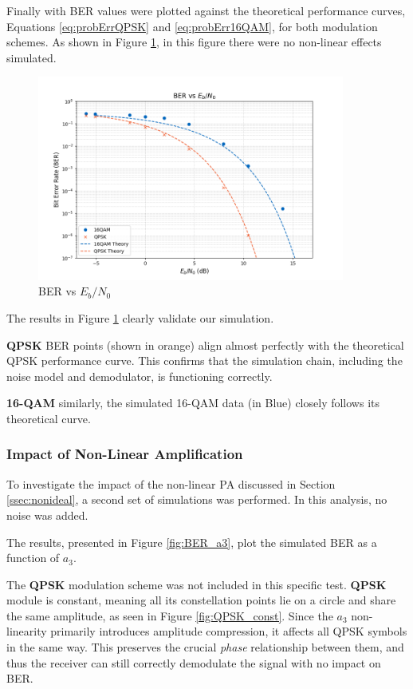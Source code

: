 Finally with BER values were plotted against the theoretical performance curves, Equations \ref{eq:probErrQPSK} and \ref{eq:probErr16QAM}, for both modulation schemes. As shown in Figure \ref{fig:BER_SNR_a3_0}, in this figure there were no non-linear effects simulated.

\begin{figure}[H]
    \centering
    \includegraphics*[width=0.9\textwidth]{Images/BER_SNR_a3_0.png}
    \caption{BER vs $E_b/N_0$}
    \label{fig:BER_SNR_a3_0}
\end{figure}

The results in Figure \ref{fig:BER_SNR_a3_0} clearly validate our simulation.

\textbf{QPSK} BER points (shown in orange) align almost perfectly with the theoretical QPSK performance curve. This confirms that the simulation chain, including the noise model and demodulator, is functioning correctly.

\textbf{16-QAM} similarly, the simulated 16-QAM data (in Blue) closely follows its theoretical curve.

\subsubsection{Impact of Non-Linear Amplification}

To investigate the impact of the non-linear PA discussed in Section \ref{ssec:nonideal}, a second set of simulations was performed. In this analysis, no noise was added.

The results, presented in Figure \ref{fig:BER_a3}, plot the simulated BER as a function of $a_3$.

The \textbf{QPSK} modulation scheme was not included in this specific test. \textbf{QPSK} module is constant, meaning all its constellation points lie on a circle and share the same amplitude, as seen in Figure \ref{fig:QPSK_const}. Since the $a_3$ non-linearity primarily introduces amplitude compression, it affects all QPSK symbols in the same way. This preserves the crucial \emph{phase} relationship between them, and thus the receiver can still correctly demodulate the signal with no impact on BER.

